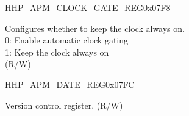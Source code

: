 \begin{register}{H}{HP\_APM\_CLOCK\_GATE\_REG}{0x07F8}\label{regdesc:HPAPMCLOCKGATEREG}
%
%
\regnewline%
\begin{regdesc}\begin{reglist}
\label{fielddesc:HPAPMCLKEN}\item [HP\_APM\_CLK\_EN] Configures whether to keep the clock always on.\\ 
0: Enable automatic clock gating \\ 
1: Keep the clock always on  \\ (R/W)
\end{reglist}\end{regdesc}
\end{register}


\begin{register}{H}{HP\_APM\_DATE\_REG}{0x07FC}\label{regdesc:HPAPMDATEREG}
%
%
\regnewline%
\begin{regdesc}\begin{reglist}
\label{fielddesc:HPAPMDATE}\item [HP\_APM\_DATE] Version control register. (R/W)
\end{reglist}\end{regdesc}
\end{register}


